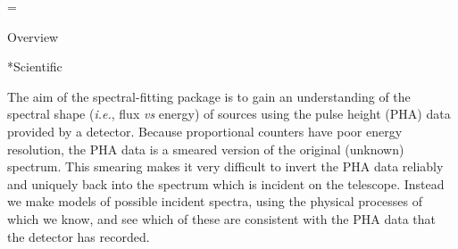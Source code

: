 =\pageno

\noindent
\@{Overview}

\**Scientific

The aim of the spectral-fitting package is to gain an understanding of the
spectral shape ({\it i.e.}, flux {\it vs} energy) of sources using the pulse
height (PHA) data provided by a detector.  Because proportional counters have
poor energy resolution, the PHA data is a smeared version of the original
(unknown) spectrum.  This smearing makes it very difficult to invert the
PHA data reliably and uniquely back into the spectrum which
is incident on the telescope.  Instead
we make models of possible incident spectra, using the physical processes of which
we know, and see which of these are consistent with the PHA
data that the detector has recorded.

